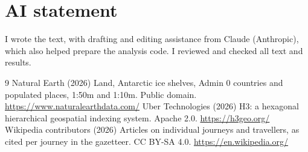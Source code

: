 \documentclass[11pt,a4paper]{article}
\begin{document}
\section*{AI statement}
I wrote the text, with drafting and editing assistance from Claude (Anthropic), which also helped prepare the analysis code. I reviewed and checked all text and results.

\begin{thebibliography}{9}
 Natural Earth (2026) Land, Antarctic ice shelves, Admin 0 countries and populated places, 1:50m and 1:10m. Public domain. \url{https://www.naturalearthdata.com/}
 Uber Technologies (2026) H3: a hexagonal hierarchical geospatial indexing system. Apache 2.0. \url{https://h3geo.org/}
 Wikipedia contributors (2026) Articles on individual journeys and travellers, as cited per journey in the gazetteer. CC BY-SA 4.0. \url{https://en.wikipedia.org/}
\end{thebibliography}
\end{document}

